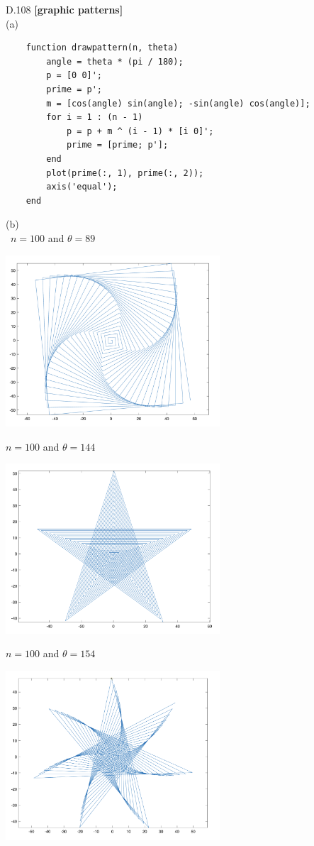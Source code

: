\documentclass{article}
\begin{document}
\break
D.108 {\bf [graphic patterns]}\\
(a)
\begin{lstlisting}
    function drawpattern(n, theta)
        angle = theta * (pi / 180);
        p = [0 0]'; 
        prime = p';
        m = [cos(angle) sin(angle); -sin(angle) cos(angle)];
        for i = 1 : (n - 1)
            p = p + m ^ (i - 1) * [i 0]';
            prime = [prime; p'];
        end
        plot(prime(:, 1), prime(:, 2));
        axis('equal');
    end
\end{lstlisting}

(b)\\\
$n = 100$ and $\theta = 89$
\begin{center}
    \includegraphics[width=0.6\textwidth]{108b1.png}
\end{center}
$n = 100$ and $\theta = 144$
\begin{center}
    \includegraphics[width=0.6\textwidth]{108b2.png}
\end{center}
$n = 100$ and $\theta = 154$
\begin{center}
    \includegraphics[width=0.6\textwidth]{108b3.png}
\end{center}
\end{document}
